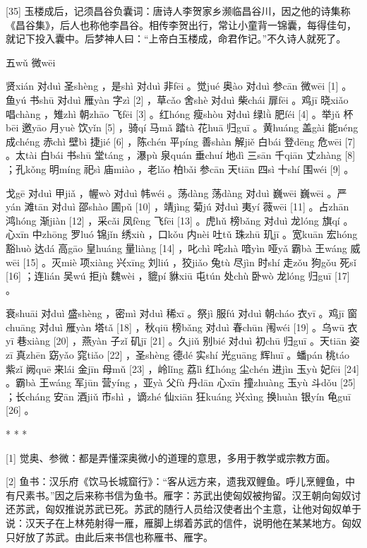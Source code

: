 \documentclass[12pt,UTF8]{ctexbook}
\begin{document}
[35] 玉楼成后，记须昌谷负囊词：唐诗人李贺家乡濒临昌谷川，因之他的诗集称《昌谷集》，后人也称他李昌谷。相传李贺出行，常让小童背一锦囊，每得佳句，就记下投入囊中。后梦神人曰：“上帝白玉楼成，命君作记。”不久诗人就死了。





五wǔ 微wēi


贤xián 对duì 圣shèng ，是shì 对duì 非fēi 。觉jué 奥ào 对duì 参cān 微wēi [1] 。鱼yú 书shū 对duì 雁yàn 字zì [2] ，草cǎo 舍shè 对duì 柴chái 扉fēi 。鸡jī 晓xiǎo 唱chàng ，雉zhì 朝zhāo 飞fēi [3] 。红hóng 瘦shòu 对duì 绿lǜ 肥féi [4] 。举jǔ 杯bēi 邀yāo 月yuè 饮yǐn [5] ，骑qí 马mǎ 踏tà 花huā 归guī 。黄huáng 盖gài 能néng 成chéng 赤chì 壁bì 捷jié [6] ，陈chén 平píng 善shàn 解jiě 白bái 登dēng 危wēi [7] 。太tài 白bái 书shū 堂táng ，瀑pù 泉quán 垂chuí 地dì 三sān 千qiān 丈zhàng [8] ；孔kǒng 明míng 祀sì 庙miào ，老lǎo 柏bǎi 参cān 天tiān 四sì 十shí 围wéi [9] 。

戈gē 对duì 甲jiǎ ，幄wò 对duì 帏wéi 。荡dàng 荡dàng 对duì 巍wēi 巍wēi 。严yán 滩tān 对duì 邵shào 圃pǔ [10] ，靖jìng 菊jú 对duì 夷yí 薇wēi [11] 。占zhān 鸿hóng 渐jiàn [12] ，采cǎi 凤fèng 飞fēi [13] 。虎hǔ 榜bǎng 对duì 龙lóng 旗qí 。心xīn 中zhōng 罗luó 锦jǐn 绣xiù ，口kǒu 内nèi 吐tǔ 珠zhū 玑jī 。宽kuān 宏hóng 豁huò 达dá 高gāo 皇huáng 量liàng [14] ，叱chì 咤zhà 喑yìn 哑yǎ 霸bà 王wáng 威wēi [15] 。灭miè 项xiàng 兴xīng 刘liú ，狡jiǎo 兔tù 尽jìn 时shí 走zǒu 狗gǒu 死sǐ [16] ；连lián 吴wú 拒jù 魏wèi ，貔pí 貅xiū 屯tún 处chù 卧wò 龙lóng 归guī [17] 。

衰shuāi 对duì 盛shèng ，密mì 对duì 稀xī 。祭jì 服fú 对duì 朝cháo 衣yī 。鸡jī 窗chuāng 对duì 雁yàn 塔tǎ [18] ，秋qiū 榜bǎng 对duì 春chūn 闱wéi [19] 。乌wū 衣yī 巷xiàng [20] ，燕yàn 子zǐ 矶jī [21] 。久jiǔ 别bié 对duì 初chū 归guī 。天tiān 姿zī 真zhēn 窈yǎo 窕tiǎo [22] ，圣shèng 德dé 实shí 光guāng 辉huī 。蟠pán 桃táo 紫zǐ 阙quē 来lái 金jīn 母mǔ [23] ，岭lǐng 荔lì 红hóng 尘chén 进jìn 玉yù 妃fēi [24] 。霸bà 王wáng 军jūn 营yíng ，亚yà 父fù 丹dān 心xīn 撞zhuàng 玉yù 斗dǒu [25] ；长cháng 安ān 酒jiǔ 市shì ，谪zhé 仙xiān 狂kuáng 兴xìng 换huàn 银yín 龟guī [26] 。



* * *



[1] 觉奥、参微：都是弄懂深奥微小的道理的意思，多用于教学或宗教方面。

[2] 鱼书：汉乐府《饮马长城窟行》：“客从远方来，遗我双鲤鱼。呼儿烹鲤鱼，中有尺素书。”因之后来称书信为鱼书。雁字：苏武出使匈奴被拘留。汉王朝向匈奴讨还苏武，匈奴推说苏武已死。苏武的随行人员给汉使者出个主意，让他对匈奴单于说：汉天子在上林苑射得一雁，雁脚上绑着苏武的信件，说明他在某某地方。匈奴只好放了苏武。由此后来书信也称雁书、雁字。
\end{document}
